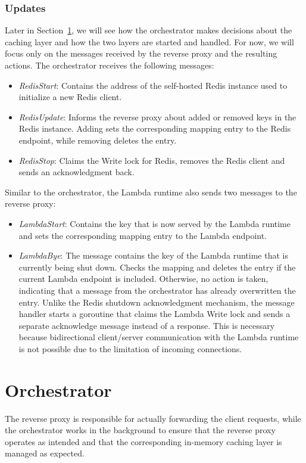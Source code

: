\subsubsection{Updates} 
Later in Section~\ref{sec:orchestrator}, we will see how the orchestrator makes decisions about the caching layer and how the two layers are started and handled. For now, we will focus only on the messages received by the reverse proxy and the resulting actions. The orchestrator receives the following messages:
\begin{itemize}
    \item \emph{RedisStart}: Contains the address of the self-hosted Redis instance used to initialize a new Redis client.
    \item \emph{RedisUpdate}: Informs the reverse proxy about added or removed keys in the Redis instance. Adding sets the corresponding mapping entry to the Redis endpoint, while removing deletes the entry.
    \item \emph{RedisStop}: Claims the Write lock for Redis, removes the Redis client and sends an acknowledgment back.  
\end{itemize}
Similar to the orchestrator, the Lambda runtime also sends two messages to the reverse proxy:
\begin{itemize}
    \item \emph{LambdaStart}: Contains the key that is now served by the Lambda runtime and sets the corresponding mapping entry to the Lambda endpoint.
    \item \emph{LambdaBye}: The message contains the key of the Lambda runtime that is currently being shut down. Checks the mapping and deletes the entry if the current Lambda endpoint is included. Otherwise, no action is taken, indicating that a message from the orchestrator has already overwritten the entry. Unlike the Redis shutdown acknowledgment mechanism, the message handler starts a goroutine that claims the Lambda Write lock and sends a separate acknowledge message instead of a response. This is necessary because bidirectional client/server communication with the Lambda runtime is not possible due to the limitation of incoming connections.
\end{itemize}

\section{Orchestrator}
\label{sec:orchestrator}
The reverse proxy is responsible for actually forwarding the client requests, while the orchestrator works in the background to ensure that the reverse proxy operates as intended and that the corresponding in-memory caching layer is managed as expected. 

